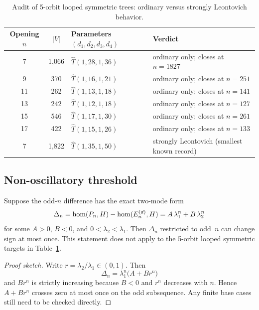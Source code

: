\begin{remark}
\begin{table}[H]
\centering
\caption{Audit of 5-orbit looped symmetric trees: ordinary versus strongly Leontovich behavior.}
\label{tab:strong_frontier}
\begin{tabular}{@{}ccll@{}}
\toprule
Opening $n$ & $|V|$ & Parameters $(d_1, d_2, d_3, d_4)$ & Verdict \\
\midrule
7 & 1,066 & $\hat{T}(1, 28, 1, 36)$ & ordinary only; closes at $n=1827$ \\
9 & 370 & $\hat{T}(1, 16, 1, 21)$ & ordinary only; closes at $n=251$ \\
11 & 262 & $\hat{T}(1, 13, 1, 18)$ & ordinary only; closes at $n=141$ \\
13 & 242 & $\hat{T}(1, 12, 1, 18)$ & ordinary only; closes at $n=127$ \\
15 & 546 & $\hat{T}(1, 17, 1, 30)$ & ordinary only; closes at $n=261$ \\
17 & 422 & $\hat{T}(1, 15, 1, 26)$ & ordinary only; closes at $n=133$ \\
\midrule
7 & 1,822 & $\hat{T}(1, 35, 1, 50)$ & strongly Leontovich (smallest known record) \\
\bottomrule
\end{tabular}
\end{table}
\end{remark}

\subsection*{Non-oscillatory threshold}

\begin{proposition}
Suppose the odd-$n$ difference has the exact two-mode form
\[
  \Delta_n = \mathrm{hom}(P_n, H) - \mathrm{hom}(E_n^{(d)}, H)
  = A\,\lambda_1^n + B\,\lambda_2^n
\]
for some $A>0$, $B<0$, and $0 < \lambda_2 < \lambda_1$. Then
$\Delta_n$ restricted to odd~$n$ can change sign at most once. This
statement does not apply to the 5-orbit looped symmetric targets in
Table~\ref{tab:strong_frontier}.
\end{proposition}

\begin{proof}[Proof sketch]
Write $r = \lambda_2/\lambda_1 \in (0,1)$. Then
\[
  \Delta_n = \lambda_1^n\bigl(A + B r^n\bigr)
\]
and $B r^n$ is strictly increasing because $B<0$ and $r^n$ decreases
with $n$. Hence $A + B r^n$ crosses zero at most once on the odd
subsequence. Any finite base cases still need to be checked directly.
\end{proof}


